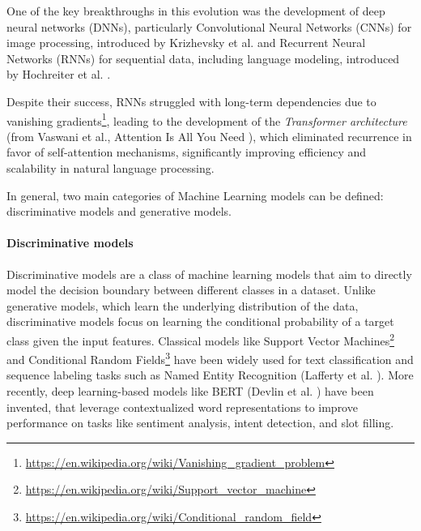 One of the key breakthroughs in this evolution was the development of deep
neural networks (DNNs), particularly Convolutional Neural Networks (CNNs) for image
processing, introduced by Krizhevsky et al. \cite{articleCNN} and Recurrent Neural
Networks (RNNs) for sequential data, including language modeling, introduced by Hochreiter
et al. \cite{articleRNN}.

Despite their success, RNNs struggled with long-term dependencies due to vanishing
gradients\footnote{\url{https://en.wikipedia.org/wiki/Vanishing_gradient_problem}},
leading to the development of the \emph{Transformer architecture} (from Vaswani et
al., Attention Is All You Need \cite{vaswani2023attentionneed}), which eliminated
recurrence in favor of self-attention mechanisms, significantly improving
efficiency and scalability in natural language processing.

In general, two main categories of Machine Learning models can be defined:
discriminative models and generative models.

\paragraph{Discriminative models}
Discriminative models are a class of machine learning models that aim to directly
model the decision boundary between different classes in a dataset. Unlike
generative models, which learn the underlying distribution of the data,
discriminative models focus on learning the conditional probability of a target
class given the input features. Classical models like Support Vector Machines\footnote{\url{https://en.wikipedia.org/wiki/Support_vector_machine}}
and Conditional Random Fields\footnote{\url{https://en.wikipedia.org/wiki/Conditional_random_field}}
have been widely used for text classification and sequence labeling tasks such as
Named Entity Recognition (Lafferty et al. \cite{crf}). More recently, deep
learning-based models like BERT (Devlin et al.
\cite{devlin2019bertpretrainingdeepbidirectional}) have been invented, that
leverage contextualized word representations to improve performance on tasks
like sentiment analysis, intent detection, and slot filling.

